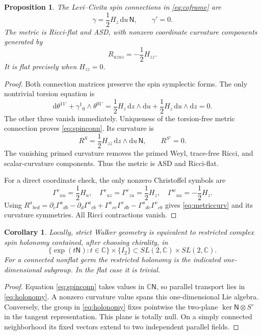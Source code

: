 \documentclass[11pt]{article}
\numberwithin{equation}{section}
\newtheorem{proposition}[theorem]{Proposition}
\newtheorem{corollary}[theorem]{Corollary}
\theoremstyle{definition}
\theoremstyle{remark}
\newcommand{\C}{\mathbb C}
\newcommand{\dd}{\mathrm d}
\newcommand{\NN}{\mathsf N}
\newcommand{\II}{I_2}
\begin{document}
\begin{proposition}\label{prop:spin}
The Levi--Civita spin connections in \eqref{eq:coframe} are
\begin{equation}\label{eq:spinconn}
\gamma=\frac12H_z\,\dd u\,\NN,\qquad \gamma'=0.
\end{equation}
The metric is Ricci-flat and ASD, with nonzero coordinate curvature components generated by
\begin{equation}\label{eq:metriccurv}
R_{uzuz}=-\frac12H_{zz}.
\end{equation}
It is flat precisely when $H_{zz}=0$.
\end{proposition}
\begin{proof}
Both connection matrices preserve the spin symplectic forms. The only nontrivial torsion equation is
\[
\dd\theta^{11'}+\gamma^1{}_0\wedge\theta^{01'}
=\frac12H_z\,\dd z\wedge\dd u+
  \frac12H_z\,\dd u\wedge\dd z=0.
\]
The other three vanish immediately. Uniqueness of the torsion-free metric connection proves \eqref{eq:spinconn}. Its curvature is
\begin{equation}\label{eq:spincurv}
R^S=\frac12H_{zz}\,\dd z\wedge\dd u\,\NN,\qquad R^{S'}=0.
\end{equation}
The vanishing primed curvature removes the primed Weyl, trace-free Ricci, and scalar-curvature components. Thus the metric is ASD and Ricci-flat.

For a direct coordinate check, the only nonzero Christoffel symbols are
\[
\Gamma^v{}_{uu}=\frac12H_u,\quad
\Gamma^v{}_{uz}=\Gamma^v{}_{zu}=\frac12H_z,\quad
\Gamma^w{}_{uu}=-\frac12H_z.
\]
Using $R^a{}_{bcd}=\partial_c\Gamma^a{}_{db}-\partial_d\Gamma^a{}_{cb}
+\Gamma^a{}_{ce}\Gamma^e{}_{db}-\Gamma^a{}_{de}\Gamma^e{}_{cb}$ gives \eqref{eq:metriccurv} and its curvature symmetries. All Ricci contractions vanish.
\end{proof}

\begin{corollary}\label{cor:holonomy}
Locally, strict Walker geometry is equivalent to restricted complex spin holonomy contained, after choosing chirality, in
\begin{equation}\label{eq:holonomy}
\{\exp(t\NN):t\in\C\}\times\{\II\}
\subset SL(2,\C)\times SL(2,\C).
\end{equation}
For a connected nonflat germ the restricted holonomy is the indicated one-dimensional subgroup. In the flat case it is trivial.
\end{corollary}
\begin{proof}
Equation \eqref{eq:spinconn} takes values in $\C\NN$, so parallel transport lies in \eqref{eq:holonomy}. A nonzero curvature value spans this one-dimensional Lie algebra. Conversely, the group in \eqref{eq:holonomy} fixes pointwise the two-plane $\ker\NN\otimes S'$ in the tangent representation. This plane is totally null. On a simply connected neighborhood its fixed vectors extend to two independent parallel fields.
\end{proof}
\end{document}
